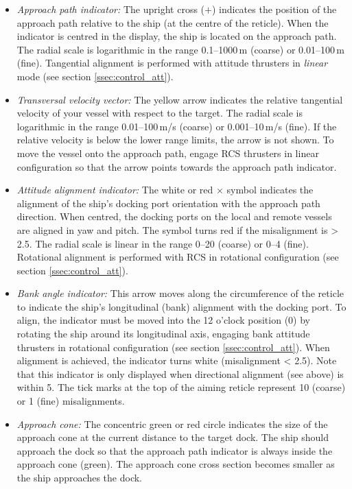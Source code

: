 \documentclass[Orbiter User Manual.tex]{subfiles}
\begin{document}
\begin{itemize}
	\item \emph{Approach path indicator:} The upright cross ($+$) indicates the
		position of the approach path relative to the ship (at the centre of the
		reticle). When the indicator is centred in the display, the ship is
		located on the approach path. The radial scale is logarithmic in the
		range 0.1--1000\,m (coarse) or 0.01--100\,m (fine). Tangential alignment
		is performed with attitude thrusters in \emph{linear} mode (see section
		\ref{ssec:control_att}).
	\item \emph{Transversal velocity vector:} The yellow arrow indicates the
		relative tangential velocity of your vessel with respect to the target.
		The radial scale is logarithmic in the range 0.01--100\,m/s (coarse) or
		0.001--10\,m/s (fine). If the relative velocity is below the lower range
		limits, the arrow is not shown. To move the vessel onto the approach
		path, engage RCS thrusters in linear configuration so that the arrow
		points towards the approach path indicator.
	\item \emph{Attitude alignment indicator:} The white or red $\times$ symbol
		indicates the alignment of the ship's docking port orientation with the
		approach path direction. When centred, the docking ports on the local
		and remote vessels are aligned in yaw and pitch. The symbol turns red if
		the misalignment is > 2.5\deg{}. The radial scale is linear in the range
		0--20\deg{} (coarse) or 0--4\deg{} (fine). Rotational alignment is
		performed with RCS in rotational configuration (see section
		\ref{ssec:control_att}).
	\item \emph{Bank angle indicator:} This arrow moves along the circumference
		of the reticle to indicate the ship's longitudinal (bank) alignment with
		the docking port. To align, the indicator must be moved into the 12
		o'clock position (0\deg{}) by rotating the ship around its longitudinal
		axis, engaging bank attitude thrusters in rotational configuration (see
		section \ref{ssec:control_att}). When alignment is achieved, the
		indicator turns white (misalignment < 2.5\deg{}). Note that this
		indicator is only displayed when directional alignment (see above) is
		within 5\deg{}. The tick marks at the top of the aiming reticle
		represent 10\deg{} (coarse) or 1\deg{} (fine) misalignments.
	\item \emph{Approach cone:} The concentric green or red circle indicates the
		size of the approach cone at the current distance to the target dock.
		The ship should approach the dock so that the approach path indicator is
		always inside the approach cone (green). The approach cone cross section
		becomes smaller as the ship approaches the dock.
\end{itemize}
\end{document}
